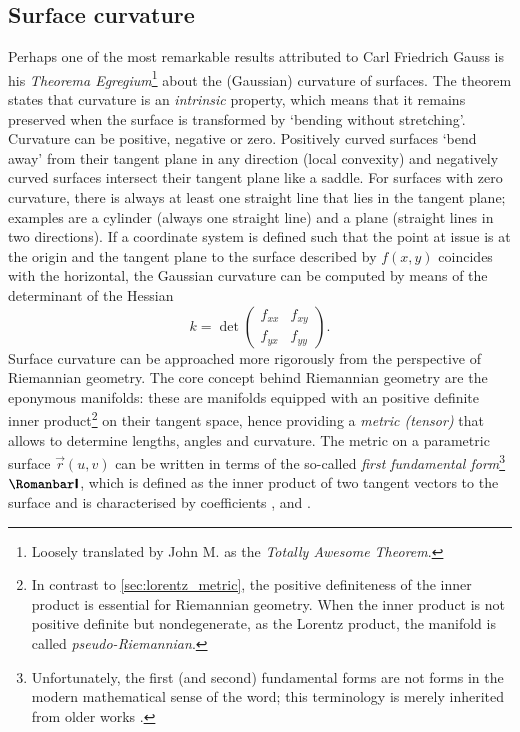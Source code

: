 \subsection{Surface curvature}
\label{ssec:curvature}
Perhaps one of the most remarkable results attributed to Carl Friedrich Gauss is his \emph{Theorema Egregium}\footnote{Loosely translated by John M. \citet{Lee1997} as the \emph{Totally Awesome Theorem}.} about the (Gaussian) curvature of surfaces. The theorem states that curvature is an \emph{intrinsic} property, which means that it remains preserved when the surface is transformed by `bending without stretching'. Curvature can be positive, negative or zero. Positively curved surfaces `bend away' from their tangent plane in any direction (local convexity) and negatively curved surfaces intersect their tangent plane like a saddle. For surfaces with zero curvature, there is always at least one straight line that lies in the tangent plane; examples are a cylinder (always one straight line) and a plane (straight lines in two directions). If a coordinate system is defined such that the point at issue is at the origin and the tangent plane to the surface described by \(f(x, y)\) coincides with the horizontal, the Gaussian curvature can be computed by means of the determinant of the Hessian \cite{Thurston1997, ONeill2006}
\[ 
    k = \det 
    \begin{pmatrix}
            f_{xx} & f_{xy}\\
            f_{yx} & f_{yy}
    \end{pmatrix}.
\]
    Surface curvature can be approached more rigorously from the perspective of Riemannian geometry. The core concept behind Riemannian geometry are the eponymous manifolds: these are manifolds equipped with an positive definite inner product\footnote{In contrast to \cref{sec:lorentz_metric}, the positive definiteness of the inner product is essential for Riemannian geometry. When the inner product is not positive definite but nondegenerate, as the Lorentz product, the manifold is called \emph{pseudo-Riemannian}.} on their tangent space, hence providing a \emph{metric (tensor)} that allows to determine lengths, angles and curvature. The metric on a parametric surface \(\vec{r}(u, v)\) can be written in terms of the so-called \emph{first fundamental form}\footnote{Unfortunately, the first (and second) fundamental forms are not forms in the modern mathematical sense of the word; this terminology is merely inherited from older works \cite{Spivak1999b}.} $\firstff$, which is defined as the inner product of two tangent vectors to the surface  and is characterised by coefficients ,  and .

